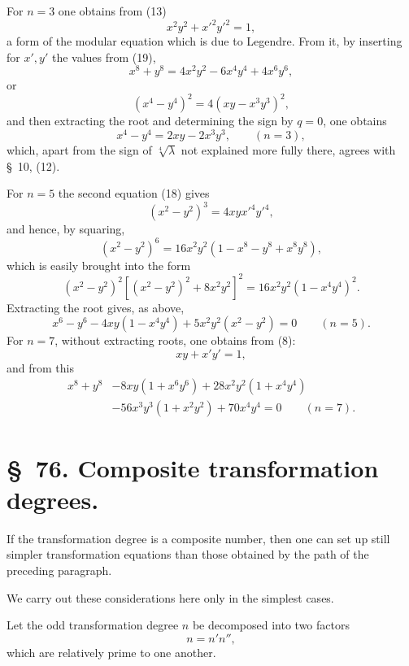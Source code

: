 \documentclass[11pt]{article}
\begin{document}
For $n=3$ one obtains from (13)
\begin{equation}
 x^2y^2+x'^2y'^2=1,
\tag{20}
\end{equation}
a form of the modular equation which is due to Legendre. From it, by inserting for $x',y'$ the values from (19),
\[
 x^8+y^8=4x^2y^2-6x^4y^4+4x^6y^6,
\]
or
\[
 (x^4-y^4)^2=4(xy-x^3y^3)^2,
\]
and then extracting the root and determining the sign by $q=0$, one obtains
\begin{equation}
 x^4-y^4=2xy-2x^3y^3,
 \qquad (n=3),
\tag{21}
\end{equation}
which, apart from the sign of $\sqrt[4]{\lambda}$ not explained more fully there, agrees with \S~10, (12).

For $n=5$ the second equation (18) gives
\[
 (x^2-y^2)^3=4xyx'^4y'^4,
\]
and hence, by squaring,
\[
 (x^2-y^2)^6=16x^2y^2(1-x^8-y^8+x^8y^8),
\]
which is easily brought into the form
\[
 (x^2-y^2)^2[(x^2-y^2)^2+8x^2y^2]^2=16x^2y^2(1-x^4y^4)^2.
\]
Extracting the root gives, as above,
\begin{equation}
 x^6-y^6-4xy(1-x^4y^4)+5x^2y^2(x^2-y^2)=0\qquad(n=5).
\tag{22}
\end{equation}
For $n=7$, without extracting roots, one obtains from (8):
\begin{equation}
 xy+x'y'=1,
\tag{23}
\end{equation}
and from this
\begin{equation}
\begin{aligned}
 x^8+y^8&-8xy(1+x^6y^6)+28x^2y^2(1+x^4y^4)\\
&-56x^3y^3(1+x^2y^2)+70x^4y^4=0\qquad(n=7).
\end{aligned}
\tag{24}
\end{equation}

\section*{\S~76. Composite transformation degrees.}

If the transformation degree is a composite number, then one can set up still simpler transformation equations than those obtained by the path of the preceding paragraph.

We carry out these considerations here only in the simplest cases.

Let the odd transformation degree $n$ be decomposed into two factors
\begin{equation}
 n=n'n'',
\tag{1}
\end{equation}
which are relatively prime to one another.
\end{document}

